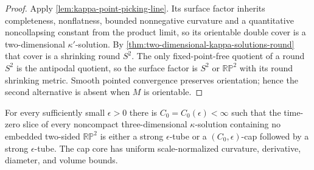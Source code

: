\begin{proof}
Apply \ref{lem:kappa-point-picking-line}.  Its surface factor inherits
completeness, nonflatness, bounded nonnegative curvature and a quantitative
noncollapsing constant from the product limit, so its orientable double cover
is a two-dimensional $\kappa'$-solution.  By
\ref{thm:two-dimensional-kappa-solutions-round} that cover is a shrinking
round $S^2$.  The only fixed-point-free quotient of a round $S^2$ is the
antipodal quotient, so the surface factor is $S^2$ or $\mathbb{RP}^2$ with its
round shrinking metric.  Smooth pointed convergence preserves orientation;
hence the second alternative is absent when $M$ is orientable.
\end{proof}

\begin{theorem}
\label{thm:noncompact-kappa-solution-structure}
\notready
For every sufficiently small $\epsilon>0$ there is
$C_0=C_0(\epsilon)<\infty$ such that the time-zero slice of every
noncompact three-dimensional $\kappa$-solution containing no embedded
two-sided $\mathbb{RP}^2$ is either a strong $\epsilon$-tube or a
$(C_0,\epsilon)$-cap followed by a strong $\epsilon$-tube.  The cap core has
uniform scale-normalized curvature, derivative, diameter, and volume bounds.
\end{theorem}


